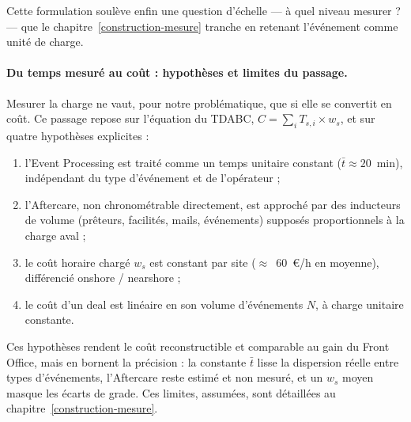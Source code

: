 Cette formulation soulève enfin une question d'échelle --- à quel niveau mesurer ? ---
que le chapitre~\ref{construction-mesure} tranche en retenant l'événement comme unité de charge.

\paragraph{Du temps mesuré au coût : hypothèses et limites du passage.}
Mesurer la charge ne vaut, pour notre problématique, que si elle se convertit en
coût. Ce passage repose sur l'équation du TDABC, $C = \sum_i T_{s,i}\times w_s$, et
sur quatre hypothèses explicites :
\begin{enumerate}
  \item l'Event Processing est traité comme un temps unitaire constant
  ($\bar t \approx 20$~min), indépendant du type d'événement et de l'opérateur ;
  \item l'Aftercare, non chronométrable directement, est approché par des
  inducteurs de volume (prêteurs, facilités, mails, événements) supposés
  proportionnels à la charge aval ;
  \item le coût horaire chargé $w_s$ est constant par site ($\approx$~60~€/h en
  moyenne), différencié onshore / nearshore ;
  \item le coût d'un deal est linéaire en son volume d'événements $N$, à charge
  unitaire constante.
\end{enumerate}
Ces hypothèses rendent le coût reconstructible et comparable au gain du Front
Office, mais en bornent la précision : la constante $\bar t$ lisse la dispersion
réelle entre types d'événements, l'Aftercare reste estimé et non mesuré, et un
$w_s$ moyen masque les écarts de grade. Ces limites, assumées, sont détaillées
au chapitre~\ref{construction-mesure}.

\newpage